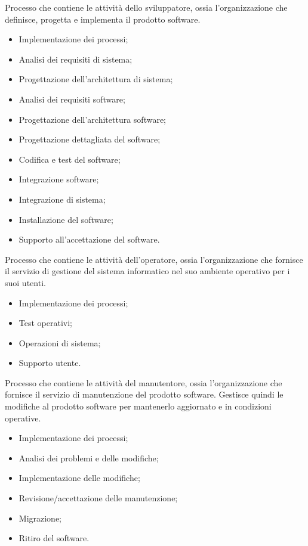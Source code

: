Processo che contiene le attività dello sviluppatore, ossia l'organizzazione che
definisce, progetta e implementa il prodotto software.
\begin{itemize}
    \item Implementazione dei processi;
    \item Analisi dei requisiti di sistema;
    \item Progettazione dell'architettura di sistema;
    \item Analisi dei requisiti software;
    \item Progettazione dell'architettura software;
    \item Progettazione dettagliata del software;
    \item Codifica e test del software;
    \item Integrazione software;
    \item Integrazione di sistema;
    \item Installazione del software;
    \item Supporto all'accettazione del software.
\end{itemize}

Processo che contiene le attività dell'operatore, ossia l'organizzazione che
fornisce il servizio di gestione del sistema informatico nel suo ambiente 
operativo per i suoi utenti.
\begin{itemize}
    \item Implementazione dei processi;
    \item Test operativi;
    \item Operazioni di sistema;
    \item Supporto utente.
\end{itemize}

Processo che contiene le attività del manutentore, ossia l'organizzazione che
fornisce il servizio di manutenzione del prodotto software. Gestisce quindi 
le modifiche al prodotto software per mantenerlo aggiornato e in condizioni operative. 
\begin{itemize}
    \item Implementazione dei processi;
    \item Analisi dei problemi e delle modifiche;
    \item Implementazione delle modifiche;
    \item Revisione/accettazione delle manutenzione;
    \item Migrazione;
    \item Ritiro del software.
\end{itemize}

